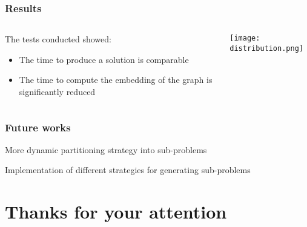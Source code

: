 \documentclass[aspectratio=169]{beamer}
\begin{document}
\begin{frame}\frametitle{Results}

    \begin{columns}
        \begin{column}{0.4\textwidth}
            The tests conducted showed:

            \begin{itemize}
                \item The time to produce a solution is comparable
                \item The time to compute the embedding of the graph is significantly reduced
            \end{itemize}
        \end{column}
        \begin{column}{0.6\textwidth}
            \begin{flushright}
                \texttt{[image: distribution.png]}            \end{flushright}
        \end{column}
    \end{columns}

\end{frame}

\begin{frame}\frametitle{Future works}

    \begin{center}
        More dynamic partitioning strategy into sub-problems 
            
        Implementation of different strategies for generating sub-problems
    \end{center}

\end{frame}

\section{Thanks for your attention}
\end{document}
